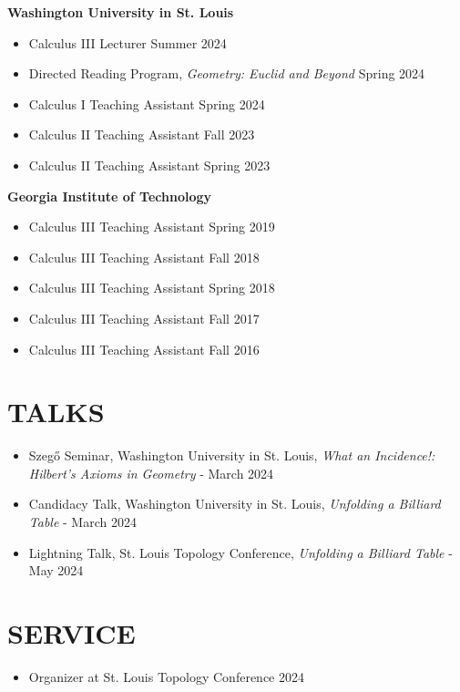 \documentclass[a4paper,11pt]{extarticle}
\begin{document}
\textbf{Washington University in St. Louis}

\begin{itemize}
    \item Calculus III Lecturer \hfill Summer 2024
    \item Directed Reading Program, \emph{Geometry: Euclid and Beyond}
    \hfill Spring 2024
    \item Calculus I Teaching Assistant
    \hfill Spring 2024
    \item Calculus II Teaching Assistant \hfill Fall 2023
    \item Calculus II Teaching Assistant \hfill Spring 2023
\end{itemize}

\noindent
\textbf{Georgia Institute of Technology}

\begin{itemize}
    \item Calculus III Teaching Assistant \hfill Spring 2019
    \item Calculus III Teaching Assistant \hfill Fall 2018
    \item Calculus III Teaching Assistant \hfill Spring 2018
    \item Calculus III Teaching Assistant \hfill Fall 2017
    \item Calculus III Teaching Assistant \hfill Fall 2016
\end{itemize}

\section*{TALKS}
\begin{itemize}
    \item Szegő Seminar, Washington University in St. Louis, \emph{What an Incidence!: Hilbert's Axioms in Geometry} - March 2024
    \item Candidacy Talk, Washington University in St. Louis, \emph{Unfolding a Billiard Table} - March 2024
    \item Lightning Talk, St. Louis Topology Conference, \emph{Unfolding a Billiard Table} - May 2024
\end{itemize}

\section*{SERVICE}
\begin{itemize}
    \item Organizer at St. Louis Topology Conference 2024
\end{itemize}


\end{document}
